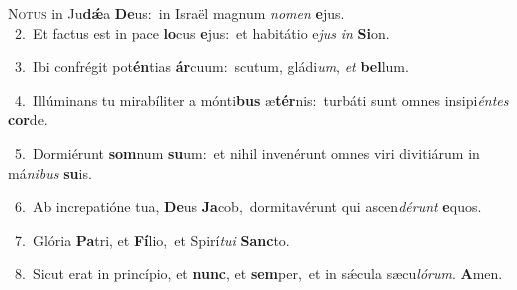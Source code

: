 \lettrine{\initial\textcolor{\initialcolor}{N}}{otus} in Ju\-\textbf{dǽ}\-a \textbf{De}\-us:~\star in Israël magnum \textit{no}\-\textit{men} \textbf{e}\-jus.\\
{\numbfont\textcolor{\numbcolor}{~2.}}~Et factus est in pace \textbf{lo}\-cus \textbf{e}\-jus:~\star et habitátio e\textit{jus} \textit{in} \textbf{Si}\-on.\par
{\numbfont\textcolor{\numbcolor}{~3.}}~Ibi confrégit pot\-\textbf{én}\-tias \textbf{ár}\-cuum:~\star scutum, gládi\-\textit{um}\-, \textit{et} \textbf{bel}\-lum.\par
{\numbfont\textcolor{\numbcolor}{~4.}}~Illúminans tu mirabíliter a mónti\textbf{bus} æ\-\textbf{tér}\-nis:~\star turbáti sunt omnes insipi\-\textit{én}\-\textit{tes} \textbf{cor}\-de.\par
{\numbfont\textcolor{\numbcolor}{~5.}}~Dormiérunt \textbf{som}\-num \textbf{su}\-um:~\star et nihil invenérunt omnes viri divitiárum in má\-\textit{ni}\-\textit{bus} \textbf{su}\-is.\par
{\numbfont\textcolor{\numbcolor}{~6.}}~Ab increpatióne tua, \textbf{De}\-us \textbf{Ja}\-cob,~\star dormitavérunt qui ascen\-\textit{dé}\-\textit{runt} \textbf{e}\-quos.\par
{\numbfont\textcolor{\numbcolor}{~7.}}~Glória \textbf{Pa}\-tri, et \textbf{Fí}\-lio,~\star et Spirí\-\textit{tu}\-\textit{i} \textbf{Sanc}\-to.\par
{\numbfont\textcolor{\numbcolor}{~8.}}~Sicut erat in princípio, et \textbf{nunc}\-, et \textbf{sem}\-per,~\star et in sǽcula sæcu\-\textit{ló}\-\textit{rum}. \textbf{A}\-men.\par
